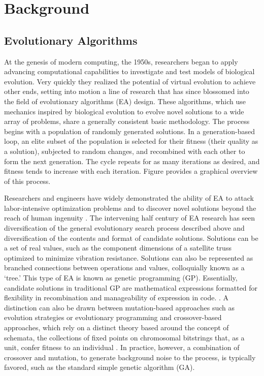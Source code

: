 \chapter{Background} \label{sec:background}
\section{Evolutionary Algorithms}
At the genesis of modern computing, the 1950s, researchers began to apply advancing computational capabilities to investigate and test models of biological evolution. Very quickly they realized the potential of virtual evolution to achieve other ends, setting into motion a line of research that has since blossomed into the field of evolutionary algorithms (EA) design. These algorithms, which use mechanics inspired by biological evolution to evolve novel solutions to a wide array of problems, share a generally consistent basic methodology. The process begins with a population of randomly generated solutions. In a generation-based loop, an elite subset of the population is selected for their fitness (their quality as a solution), subjected to random changes, and recombined with each other to form the next generation. The cycle repeats for as many iterations as desired, and fitness tends to increase with each iteration. Figure  provides a graphical overview of this process.

Researchers and engineers have widely demonstrated the ability of EA to attack labor-intensive optimization problems and to discover novel solutions beyond the reach of human ingenuity \cite{Poli2008AProgramming}. The intervening half century of EA research has seen diversification of the general evolutionary search process described above and diversification of the contents and format of candidate solutions. Solutions can be a set of real values, such as the component dimensions of a satellite truss optimized to minimize vibration resistance. Solutions can also be represented as branched connections between operations and values, colloquially known as a ‘tree.’ This type of EA is known as genetic programming (GP). Essentially, candidate solutions in traditional GP are mathematical expressions formatted for flexibility in recombination and manageability of expression in code. \cite{Poli2008AProgramming}. A distinction can also be drawn between mutation-based approaches such as evolution strategies or evolutionary programming and crossover-based approaches, which rely on a distinct theory based around the concept of schemata, the collections of fixed points on chromosomal bitstrings that, as a unit, confer fitness to an individual \cite{2006RepresentationsAlgorithms}. In practice, however, a combination of crossover and mutation, to generate background noise to the process, is typically favored, such as the standard simple genetic algorithm (GA).

